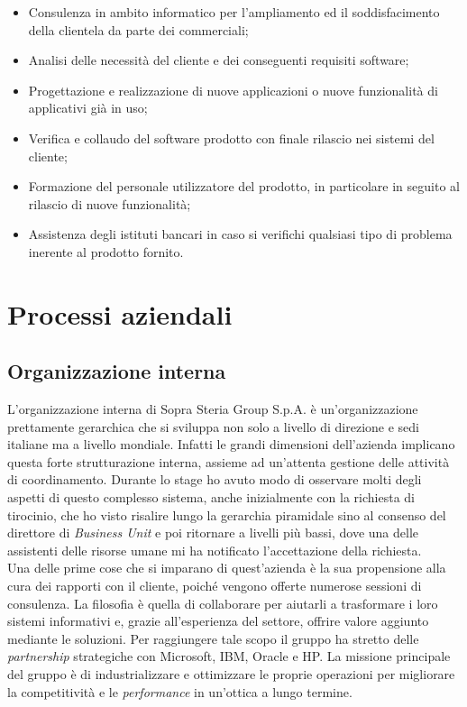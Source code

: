 	\begin{itemize}
		\item Consulenza in ambito informatico per l'ampliamento ed il soddisfacimento della clientela da parte dei commerciali;
		\item Analisi delle necessità del cliente e dei conseguenti requisiti software;
		\item Progettazione e realizzazione di nuove applicazioni o nuove funzionalità di applicativi già in uso;
		\item Verifica e collaudo del software prodotto con finale rilascio nei sistemi del cliente;
		\item Formazione del personale utilizzatore del prodotto, in particolare in seguito al rilascio di nuove funzionalità;
		\item Assistenza degli istituti bancari in caso si verifichi qualsiasi tipo di problema inerente al prodotto fornito.
	\end{itemize}	 

\newpage
\section{Processi aziendali}

	\subsection{Organizzazione interna}
	
	L'organizzazione interna di Sopra Steria Group S.p.A. è un'organizzazione prettamente gerarchica	 che si sviluppa non solo a livello di direzione e sedi italiane ma a livello mondiale. Infatti le grandi dimensioni dell'azienda implicano questa forte strutturazione interna, assieme ad un'attenta gestione delle attività di coordinamento. Durante lo stage ho avuto modo di osservare molti degli aspetti di questo complesso sistema, anche inizialmente con la richiesta di tirocinio, che ho visto risalire lungo la gerarchia piramidale sino al consenso del direttore di \textit{Business Unit} e poi ritornare a livelli più bassi, dove una delle assistenti delle risorse umane mi ha notificato l'accettazione della richiesta.\\
	
	Una delle prime cose che si imparano di quest'azienda è la sua propensione alla cura dei rapporti con il cliente, poiché vengono offerte numerose sessioni	di consulenza. La filosofia è quella di collaborare per aiutarli a trasformare i loro sistemi informativi e, grazie all'esperienza del settore, offrire valore aggiunto mediante le soluzioni. Per raggiungere tale scopo il gruppo ha stretto delle \textit{partnership} strategiche con Microsoft, IBM, Oracle e HP. La missione principale del gruppo è di industrializzare e ottimizzare le proprie operazioni per migliorare la competitività e le  \textit{performance} in un'ottica a lungo termine.\\
	
